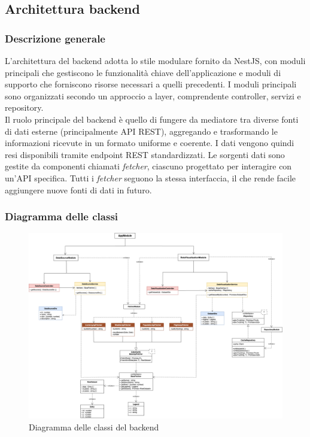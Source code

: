 \subsection{Architettura backend}

\subsubsection{Descrizione generale} 
L’architettura del backend adotta lo stile modulare fornito da NestJS, con moduli principali che gestiscono le funzionalità chiave dell'applicazione e moduli di supporto che forniscono risorse necessari a quelli precedenti. I moduli principali sono organizzati secondo un approccio a layer, comprendente controller, servizi e repository.\\
Il ruolo principale del backend è quello di fungere da mediatore tra diverse fonti di dati esterne (principalmente API REST), aggregando e trasformando le informazioni ricevute in un formato uniforme e coerente. I dati vengono quindi resi disponibili tramite endpoint REST standardizzati. Le sorgenti dati sono gestite da componenti chiamati \textit{fetcher}, ciascuno progettato per interagire con un'API specifica. Tutti i \textit{fetcher} seguono la stessa interfaccia, il che rende facile aggiungere nuove fonti di dati in futuro.

\subsubsection{Diagramma delle classi}
\begin{figure}[H]
    \begin{center}
        \includegraphics[scale = 0.29]{template/images/uml_back/BackendUML.png}
        \caption{Diagramma delle classi del backend}
    \end{center}     
    
\end{figure}

